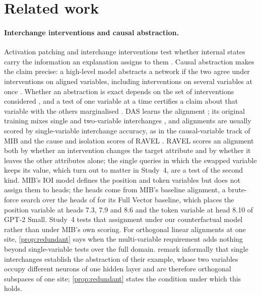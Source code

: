 \section{Related work}\label{sec:related}

\paragraph{Interchange interventions and causal abstraction.}
Activation patching and interchange interventions test whether internal states carry the information an
explanation assigns to them \citep{vig2020gender,meng2022rome,wang2023ioi,geiger2021causal}. Causal abstraction
makes the claim precise: a high-level model abstracts a network if the two agree under interventions on aligned
variables, including interventions on several variables at once \citep{beckers2019abstracting,
rubenstein2017consistency,geiger2025abstraction}. Whether an abstraction is exact depends on the set of
interventions considered \citep{rubenstein2017consistency}, and a test of one variable at a time certifies a
claim about that variable with the others marginalised \citep{geiger2022iit}. DAS learns the alignment
\citep{geiger2024das,wu2023boundless}; its original training mixes single and two-variable interchanges
\citep[Appendix~A.1]{geiger2024das}, and alignments are usually scored by single-variable interchange accuracy, as in
the causal-variable track of MIB \citep{mueller2025mib} and the cause and isolation scores of RAVEL
\citep{huang2024ravel}. RAVEL scores an alignment both by whether an intervention changes the target attribute and by
whether it leaves the other attributes alone; the single queries in which the swapped variable keeps its value, which
turn out to matter in Study~4, are a test of the second kind. MIB's IOI model defines the position and token variables
but does not assign them to heads; the heads come from MIB's baseline alignment, a brute-force search over the heads
of \citet{wang2023ioi} for its Full Vector baseline, which places the position variable at heads 7.3, 7.9 and 8.6 and
the token variable at head 8.10 of GPT-2 Small. Study~4 tests that assignment under our counterfactual model rather
than under MIB's own scoring. For orthogonal linear alignments at one site,
\cref{prop:redundant} says when the multi-variable requirement adds nothing beyond single-variable tests over the full
domain. \citet{geiger2021causal} remark informally that single interchanges establish the abstraction of their
example, whose two variables occupy different neurons of one hidden layer and are therefore orthogonal subspaces of
one site; \cref{prop:redundant} states the condition under which this holds.

